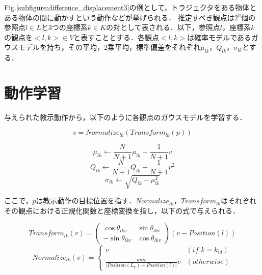 Fig.\ref{subfigure:difference_displacement3}の例として，トラジェクタをある物体とある物体の間に動かすという動作などが挙げられる．
推定すべき観点は$2^{n}$個の参照点$l∈L$と3つの座標系$k∈K$の対として表される．以下，参照点$l$，座標系$k$の観点を$<l , k> ∈ V$と表すこととする．各観点$<l , k>$は確率モデルであるガウスモデルを持ち，その平均，2乗平均，標準偏差をそれぞれ$μ_{lk}$，$Q_{lk}$，$σ_{lk}$とする．

\section{動作学習}

与えられた教示動作から，以下のように各観点のガウスモデルを学習する．

\begin{equation}
	v = Normalize_{lk}(Transform_{lk}(p))
\end{equation}

\begin{equation}
	μ_{lk}  \leftarrow \frac{N}{N+1}μ_{lk}+\frac{1}{N+1}v
\end{equation}
\begin{equation}
	Q_{lk}  \leftarrow \frac{N}{N+1}Q_{lk}+\frac{1}{N+1}v^2	
\end{equation}
\begin{equation}
	σ_{lk}  \leftarrow \sqrt{Q_{lk} - μ_{lk}^2}
\end{equation}

ここで，$p$は教示動作の目標位置を指す．$Normalize_{lk}$，$Transform_{lk}$はそれぞれその観点における正規化関数と座標変換を指し，以下の式で与えられる．

\begin{equation}
	Transform_{lk}(v) = 
	\begin{pmatrix}
        	\cos θ_{lkv} & \sin θ_{lkv} \\
        	-\sin θ_{lkv} & \cos θ_{lkv}
	\end{pmatrix}
	(v-Position(l))
\end{equation}
\begin{equation}
	\label{equation:normalize}
	Normalize_{lk}(v) = 
	\begin{cases}
		v & (if\,\,k=k_{id}) \\
		\frac{unit}{| Position(L_{k})-Position(l) |}v & (otherwise)
	\end{cases}
\end{equation}

